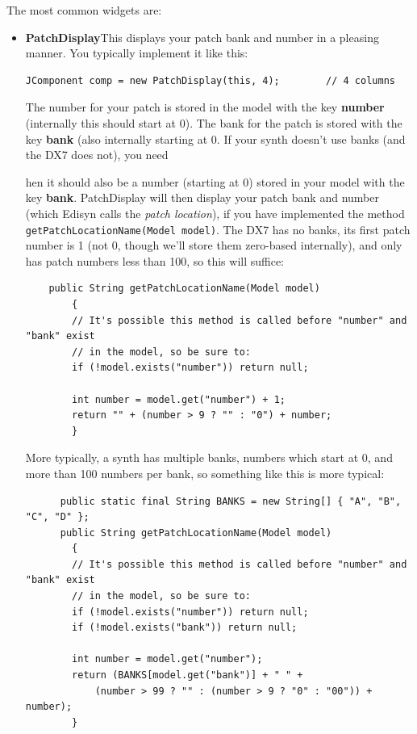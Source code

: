 \documentclass{article}
\begin{document}
The most common widgets are:

\begin{itemize}
\item {\bf PatchDisplay}\quad This displays your patch bank and number in a pleasing manner.  You typically implement it like this:
\begin{verbatim}
JComponent comp = new PatchDisplay(this, 4);		// 4 columns
\end{verbatim}

The number for your patch is stored in the model with the key {\bf number} (internally this should start at 0).  The bank for the patch is stored with the key {\bf bank} (also internally starting at 0.  If your synth doesn't use banks (and the DX7 does not), you need 

hen it should also be a number (starting at 0) stored in your model with the key {\bf bank}.  PatchDisplay will then display your patch bank and number (which Edisyn calls the {\it patch location}), if you have implemented the method {\tt getPatchLocationName(Model model)}.  The DX7 has no banks, its first patch number is 1 (not 0, though we'll store them zero-based internally), and only has patch numbers less than 100, so this will suffice:

\begin{verbatim}
    public String getPatchLocationName(Model model)
        {
        // It's possible this method is called before "number" and "bank" exist
        // in the model, so be sure to:
        if (!model.exists("number")) return null;
        
        int number = model.get("number") + 1;
        return "" + (number > 9 ? "" : "0") + number;
        }
\end{verbatim}

More typically, a synth has multiple banks, numbers which start at 0, and more than 100 numbers per bank, so something like this is more typical:

\begin{verbatim}
      public static final String BANKS = new String[] { "A", "B", "C", "D" };
      public String getPatchLocationName(Model model)
        {
        // It's possible this method is called before "number" and "bank" exist
        // in the model, so be sure to:
        if (!model.exists("number")) return null;
        if (!model.exists("bank")) return null;
        
        int number = model.get("number");
        return (BANKS[model.get("bank")] + " " + 
            (number > 99 ? "" : (number > 9 ? "0" : "00")) + number);
        }
\end{verbatim}


\end{itemize}
\end{document}
